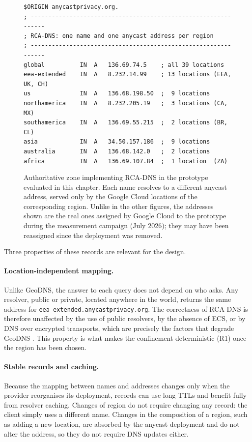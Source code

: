 \documentclass[
A4paper,                %
twoside,                %
openright,              %
chapterprefix=true,     %
12pt,                   %
headings=normal,        %
titlepage=on            %
]{book}
\begin{document}
\begin{figure}[ht]
    \centering
\begin{Verbatim}[fontsize=\footnotesize, frame=single, framesep=3mm, rulecolor=\color{black!55}]
$ORIGIN anycastprivacy.org.
; ---------------------------------------------------------------
; RCA-DNS: one name and one anycast address per region
; ---------------------------------------------------------------
global          IN  A   136.69.74.5    ; all 39 locations
eea-extended    IN  A   8.232.14.99    ; 13 locations (EEA, UK, CH)
us              IN  A   136.68.198.50  ;  9 locations
northamerica    IN  A   8.232.205.19   ;  3 locations (CA, MX)
southamerica    IN  A   136.69.55.215  ;  2 locations (BR, CL)
asia            IN  A   34.50.157.186  ;  9 locations
australia       IN  A   136.68.142.0   ;  2 locations
africa          IN  A   136.69.107.84  ;  1 location  (ZA)
\end{Verbatim}
    \caption{Authoritative zone implementing RCA-DNS in the prototype evaluated in this chapter. Each name resolves to a different anycast address, served only by the Google Cloud locations of the corresponding region. Unlike in the other figures, the addresses shown are the real ones assigned by Google Cloud to the prototype during the measurement campaign (July 2026); they may have been reassigned since the deployment was removed.}
    \label{fig:rcadns_zone}
\end{figure}

Three properties of these records are relevant for the design.

\paragraph{Location-independent mapping.} Unlike GeoDNS, the answer to each query does not depend on who asks. Any resolver, public or private, located anywhere in the world, returns the same address for \texttt{eea-extended.anycastprivacy.org}. The correctness of RCA-DNS is therefore unaffected by the use of public resolvers, by the absence of ECS, or by DNS over encrypted transports, which are precisely the factors that degrade GeoDNS \cite{Otto2012ContentSolutions, Contavalli2016ClientQueries}. This property is what makes the confinement deterministic (R1) once the region has been chosen.

\paragraph{Stable records and caching.} Because the mapping between names and addresses changes only when the provider reorganises its deployment, records can use long TTLs and benefit fully from resolver caching. Changes of region do not require changing any record: the client simply uses a different name. Changes in the composition of a region, such as adding a new location, are absorbed by the anycast deployment and do not alter the address, so they do not require DNS updates either.
\end{document}

